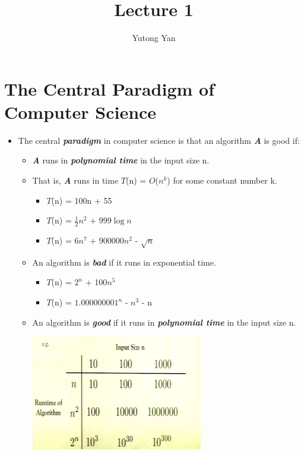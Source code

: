 \documentclass[12pt]{article}
\title{\huge Lecture 1}
\author{Yutong Yan}
\date{}
\begin{document}
\maketitle

\section{The Central Paradigm of Computer Science}
\renewcommand{\labelitemii}{$\circ$}
\renewcommand{\labelitemiii}{$\cdot$}
\begin{itemize}
\item The central \textbf{\textit{paradigm}}  in computer science is that an algorithm \textbf{\textit{A}} is good if:
	\begin{itemize}
	\item \textbf{\textit{A}} runs in \textbf{\textit{polynomial time}} in the input size n.
	\item That is, \textbf{\textit{A}} runs in time $T$(n) = $O$($n^k$) for some constant number k.
		\begin{itemize}
		\item $T$(n) = 100n + 55
		\item $T$(n) = \( \frac{1}{2} \)$n^2$ + $999\log{}n$
		\item $T$(n) = 6$n^7$ + 900000$n^2$ - $\sqrt{n}$			
		\end{itemize}
	\item An algorithm is \textbf{\textit{bad}} if it runs in exponential time.
		\begin{itemize}
		\item $T$(n) = $2^n$ + 100$n^5$
		\item $T$(n) = $1.000000001^n$ - $n^3$ - n 
		\end{itemize}	
	\item An algorithm is \textbf{\textit{good}} if it runs in \textbf{\textit{polynomial time}} in the input size n.
	\begin{center}
	\includegraphics{lecture1a}
	\end{center}
	\end{itemize}
\end{itemize}
\end{document}
